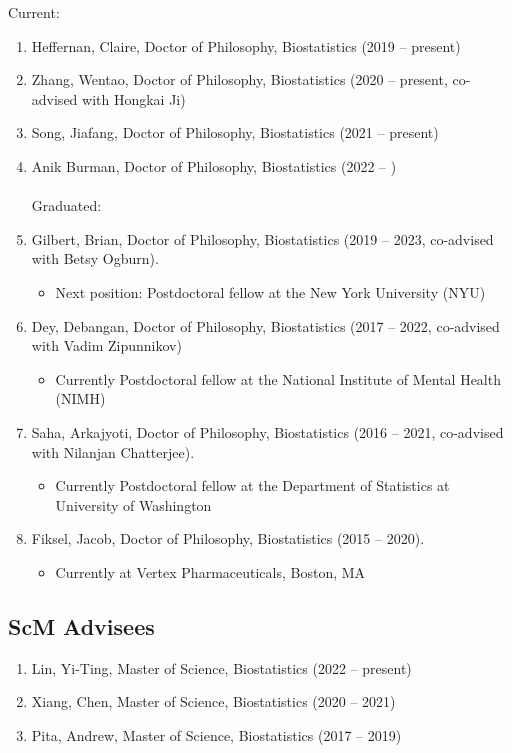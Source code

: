 \documentclass[12pt]{article}
\newcommand{\myben}[1]{\smallskip\begin{enumerate}[start=1,label={\scriptsize \arabic*$\ $},leftmargin=\parindent]\setlength{\itemsep}{#1}\vspace*{-0.7em}}
\newcommand{\ee}{\end{enumerate}}
\begin{document}
Current:
\myben{-0.1em}
\item Heffernan, Claire, Doctor of Philosophy, Biostatistics (2019 -- present)
\item Zhang, Wentao, Doctor of Philosophy, Biostatistics (2020 -- present, co-advised with Hongkai Ji)
\item Song, Jiafang, Doctor of Philosophy, Biostatistics (2021 -- present)
\item Anik Burman, Doctor of Philosophy, Biostatistics (2022 -- ) \\\\ Graduated:\\
\item Gilbert, Brian, Doctor of Philosophy, Biostatistics (2019 -- 2023, co-advised with Betsy Ogburn).
\begin{itemize}
	\item Next position: Postdoctoral fellow at the New York University (NYU)
\end{itemize}
\item Dey, Debangan, Doctor of Philosophy, Biostatistics (2017 -- 2022, co-advised with Vadim Zipunnikov)
\begin{itemize}
	\item Currently Postdoctoral fellow at the National Institute of Mental Health (NIMH)
\end{itemize}
\item Saha, Arkajyoti, Doctor of Philosophy, Biostatistics (2016 -- 2021, co-advised with Nilanjan Chatterjee).
\begin{itemize}
	\item Currently Postdoctoral fellow at the Department of Statistics at University of Washington
\end{itemize}
\item Fiksel, Jacob, Doctor of Philosophy, Biostatistics (2015 -- 2020).
\begin{itemize}
	\item Currently at Vertex Pharmaceuticals, Boston, MA
\end{itemize}

\ee

\subsection*{ScM Advisees}

\myben{-0.1em}
\item Lin, Yi-Ting, Master of Science, Biostatistics (2022 -- present)
\item Xiang, Chen, Master of Science, Biostatistics (2020 -- 2021)
\item Pita, Andrew, Master of Science, Biostatistics (2017 -- 2019)
\ee
\end{document}
